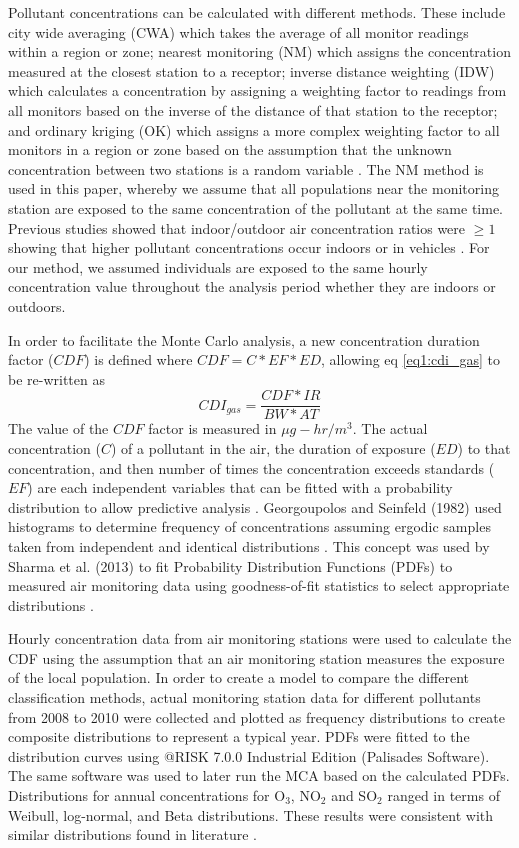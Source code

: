 Pollutant concentrations can be calculated with different methods. These include city wide averaging (CWA) which takes the average of all monitor readings within a region or zone; nearest monitoring (NM) which assigns the concentration measured at the closest station to a receptor; inverse distance weighting (IDW) which calculates a concentration by assigning a weighting factor to readings from all monitors based on the inverse of the distance of that station to the receptor; and ordinary kriging (OK) which assigns a more complex weighting factor to all monitors in a region or zone based on the assumption that the unknown concentration between two stations is a random variable \citep{Rivera2015}. The NM method is used in this paper, whereby we assume that all populations near the monitoring station are exposed to the same concentration of the pollutant at the same time. Previous studies showed that indoor/outdoor air concentration ratios were $\geq 1$ showing that higher pollutant concentrations occur indoors \citep{Schembari2013} or in vehicles \citep{Abi-Esber2013}. For our method, we assumed individuals are exposed to the same hourly concentration value throughout the analysis period whether they are indoors or outdoors.

In order to facilitate the Monte Carlo analysis, a new concentration duration factor ($CDF$) is defined where $CDF = C*EF*ED$, allowing eq \ref{eq1:cdi_gas} to be re-written as
%
\begin{equation}
\label{eq2:cdf_gas}
CDI_{gas} = \frac{CDF*IR}{BW*AT}
\end{equation}
%
The value of the $CDF$ factor is measured in $\mu g-hr/m^{3}$. The actual concentration ($C$) of a pollutant in the air, the duration of exposure ($ED$) to that concentration, and then number of times the concentration exceeds standards ($EF$) are each independent variables  that can be fitted with a probability distribution to allow predictive analysis \citep{Lonati2011}. Georgoupolos and Seinfeld (1982) used histograms to determine frequency of concentrations assuming ergodic samples taken from independent and identical distributions \citep{Georgopoulos1982}. This concept was used by Sharma et al. (2013) to fit Probability Distribution Functions (PDFs) to measured air monitoring data using goodness-of-fit statistics to select appropriate distributions \citep{Sharma2013}. 

Hourly concentration data from air monitoring stations were used to calculate the CDF using the assumption that an air monitoring station measures the exposure of the local population.  In order to create a model to compare the different classification methods, actual monitoring station data for different pollutants from 2008 to 2010 were collected and plotted as frequency distributions to create composite distributions to represent a typical year. PDFs were fitted to the distribution curves using @RISK 7.0.0 Industrial Edition (Palisades Software). The same software was used to later run the MCA based on the calculated PDFs. Distributions for annual concentrations for O$_{3}$, NO$_{2}$ and SO$_{2}$ ranged in terms of Weibull, log-normal, and Beta distributions. These results were consistent with similar distributions found in literature \citep{Lu2003, Morel1999, Noor2011}.

